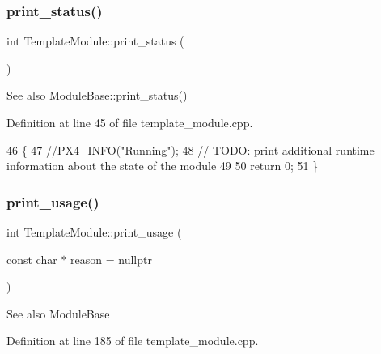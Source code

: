 \subsubsection{\texorpdfstring{print\+\_\+status()}{print\_status()}}
{\footnotesize\ttfamily int Template\+Module\+::print\+\_\+status (\begin{DoxyParamCaption}{ }\end{DoxyParamCaption})\hspace{0.3cm}{\ttfamily [override]}}

\begin{DoxySeeAlso}{See also}
Module\+Base\+::print\+\_\+status() 
\end{DoxySeeAlso}


Definition at line 45 of file template\+\_\+module.\+cpp.


\begin{DoxyCode}
46 \{
47     \textcolor{comment}{//PX4\_INFO("Running");}
48     \textcolor{comment}{// TODO: print additional runtime information about the state of the module}
49 
50     \textcolor{keywordflow}{return} 0;
51 \}
\end{DoxyCode}
\mbox{\label{classTemplateModule_a5ce5da37ebb624d8fbf301343d0ed341}} 
\subsubsection{\texorpdfstring{print\+\_\+usage()}{print\_usage()}}
{\footnotesize\ttfamily int Template\+Module\+::print\+\_\+usage (\begin{DoxyParamCaption}\item[{const char $\ast$}]{reason = {\ttfamily nullptr} }\end{DoxyParamCaption})\hspace{0.3cm}{\ttfamily [static]}}

\begin{DoxySeeAlso}{See also}
Module\+Base 
\end{DoxySeeAlso}


Definition at line 185 of file template\+\_\+module.\+cpp.


